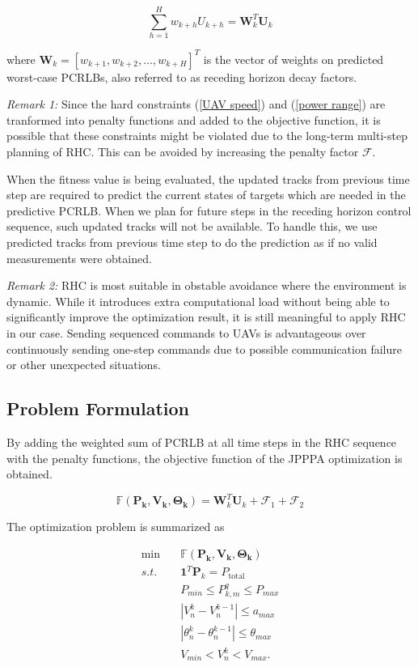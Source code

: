 \documentclass[12pt,journal,draftclsnofoot,onecolumn]{IEEEtran}
\begin{document}
\begin{equation}
	\sum_{h=1}^{H}w_{k+h}U_{k+h}=\mathbf{W}_k^T\mathbf{U}_k
\end{equation}

where $\mathbf{W}_k=[w_{k+1}, w_{k+2},...,w_{k+H}]^T$ is the vector of weights on predicted worst-case PCRLBs, also referred to as receding horizon decay factors.

\emph{Remark 1:} Since the hard constraints (\ref{UAV speed}) and (\ref{power range}) are tranformed into penalty functions and added to the objective function, it is possible that these constraints might be violated due to the long-term multi-step planning of RHC. This can be avoided by increasing the penalty factor $\mathcal{F}$.

When the fitness value is being evaluated, the updated tracks from previous time step are required to predict the current states of targets which are needed in the predictive PCRLB. When we plan for future steps in the receding horizon control sequence, such updated tracks will not be available. To handle this, we use predicted tracks from previous time step to do the prediction as if no valid measurements were obtained.

\emph{Remark 2:} RHC is most suitable in obstable avoidance\cite{frew2005receding} where the environment is dynamic. While it introduces extra computational load without being able to significantly improve the optimization result, it is still meaningful to apply RHC in our case. Sending sequenced commands to UAVs is advantageous over continuously sending one-step commands due to possible communication failure or other unexpected situations.

\subsection{Problem Formulation}
By adding the weighted sum of PCRLB at all time steps in the RHC sequence with the penalty functions, the objective function of the JPPPA optimization is obtained.

\begin{equation}
	\mathbb{F}(\mathbf{P_k},\mathbf{V_k},\mathbf{\Theta_k})=\mathbf{W}_k^T\mathbf{U}_k + \mathcal{F}_1 + \mathcal{F}_2
\end{equation}

The optimization problem is summarized as

\begin{align} 
\min \quad & \mathbb{F}(\mathbf{P_k},\mathbf{V_k},\mathbf{\Theta_k})\nonumber\\ s.t.\quad & {{{\mathbf 1}^T}{{\mathbf P}_k}={P_{\text{total}}}} \nonumber\\ & P_{min}\leq P_{k,m}^q\leq P_{max}\nonumber\\ &|V_n^k-V_n^{k-1}|\leq a_{max} \nonumber\\ &|\theta_n^k-\theta_n^{k-1}|\leq \theta_{max}\\ &V_{min}<V_n^k<V_{max} . 
\label{problem}
\end{align}
\end{document}
